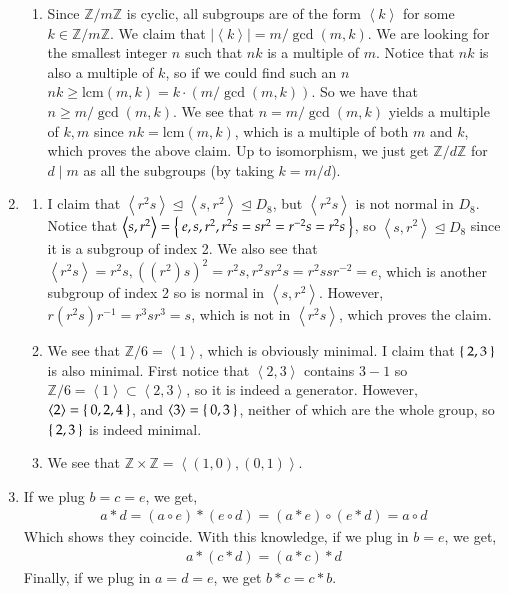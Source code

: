 \documentclass[12pt]{article}
\theoremstyle{definitionstyle}
\def\mbb#1{\mathbb{#1}}
\newcommand{\Z}{\mbb Z}
\newcommand{\gen}[1]{\left\langle #1 \right\rangle}
\newcommand{\nsg}{\trianglelefteq}
\begin{document}
\begin{enumerate}[leftmargin=\labelsep]
\begin{enumerate}
			\item Since $\Z / m\Z$ is cyclic, all subgroups are of the form $\gen{k}$ for some $k \in \Z / m\Z$. We claim that $|\gen{k}| = m/\gcd(m, k)$. We are looking for the smallest integer $n$ such that $nk$ is a multiple of $m$. Notice that $nk$ is also a multiple of $k$, so if we could find such an $n$ $nk \geq \mathrm{lcm}(m, k) = k \cdot (m / \gcd(m, k))$. So we have that $n \geq m / \gcd(m, k)$. We see that $n = m / \gcd(m, k)$ yields a multiple of $k, m$ since $nk = \mathrm{lcm}(m, k)$, which is a multiple of both $m$ and $k$, which proves the above claim. Up to isomorphism, we just get $\Z / d \Z$ for $d \mid m$ as all the subgroups (by taking $k = m/d$).
		\end{enumerate}
		\item \begin{enumerate}
			\item I claim that $\gen{r^2s} \nsg \gen{s, r^2} \nsg D_8$, but $\gen{r^2s}$ is not normal in $D_8$. Notice that $\gen{s, r^2} = \Set{e, s, r^2, r^2s = sr^2 = r^{-2}s = r^2s}$, so $\gen{s, r^2} \nsg D_8$ since it is a subgroup of index 2. We also see that $\gen{r^2s} = {r^2s, ((r^2)s)^2} = {r^2s, r^2sr^2s = r^2ssr^{-2} = e}$, which is another subgroup of index 2 so is normal in $\gen{s, r^2}$. However, $r (r^2s)r^{-1} = r^3sr^3 = s$, which is not in $\gen{r^2s}$, which proves the claim.
			
			\item We see that $\Z/6 = \gen{1}$, which is obviously minimal. I claim that $\Set{2, 3}$ is also minimal. First notice that $\gen{2, 3}$ contains $3 - 1$ so $\Z/6 = \gen{1} \subset \gen{2, 3}$, so it is indeed a generator. However, $\gen{2} = \Set{0, 2, 4}$, and $\gen{3} = \Set{0, 3}$, neither of which are the whole group, so $\Set{2,3}$ is indeed minimal.
			
			\item We see that $\Z \times \Z = \gen{(1, 0), (0,1)}$.
		\end{enumerate}
		\item If we plug $b = c = e$, we get,
		\begin{align*}
			a * d = (a \circ e) * (e \circ d) = (a * e) \circ (e * d) = a \circ d
		\end{align*}
		Which shows they coincide. With this knowledge, if we plug in $b = e$, we get,
		\begin{align*}
			a * (c * d) = (a * c) * d
		\end{align*}
		Finally, if we plug in $a = d = e$, we get $b * c = c * b$.
		

\end{enumerate}
\end{document}
